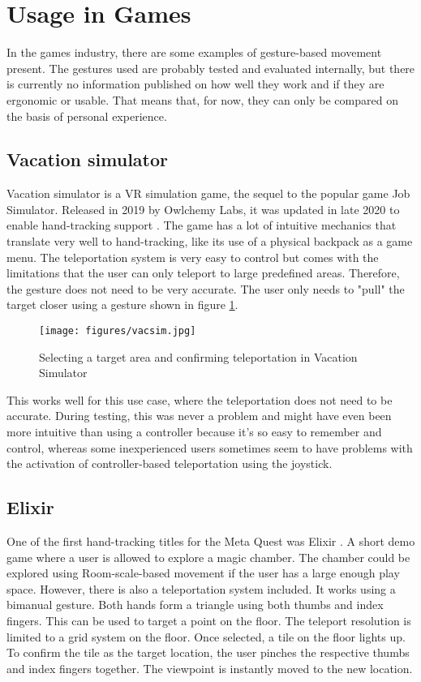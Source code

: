 \section{Usage in Games}
In the games industry, there are some examples of gesture-based movement present. The gestures used are probably tested and evaluated internally, but there is currently no information published on how well they work and if they are ergonomic or usable. That means that, for now, they can only be compared on the basis of personal experience. 


\subsection{Vacation simulator}
Vacation simulator \cite{VacSimOculus} is a VR simulation game, the sequel to the popular game Job Simulator. Released in 2019 by Owlchemy Labs, it was updated in late 2020 to enable hand-tracking support \cite{VacSimBlog}. The game has a lot of intuitive mechanics that translate very well to hand-tracking, like its use of a physical backpack as a game menu. The teleportation system is very easy to control but comes with the limitations that the user can only teleport to large predefined areas. Therefore, the gesture does not need to be very accurate. The user only needs to "pull" the target closer using a gesture shown in figure \ref{fig:pull}. 

\begin{figure}[hbt!]
  \centering
  \texttt{[image: figures/vacsim.jpg]}
  \caption{Selecting a target area and confirming teleportation in Vacation Simulator}
  \label{fig:pull}
\end{figure}

This works well for this use case, where the teleportation does not need to be accurate. During testing, this was never a problem and might have even been more intuitive than using a controller because it's so easy to remember and control, whereas some inexperienced users sometimes seem to have problems with the activation of controller-based teleportation using the joystick. 


\subsection{Elixir}
One of the first hand-tracking titles for the Meta Quest was Elixir \cite{Magnopus}. A short demo game where a user is allowed to explore a magic chamber. The chamber could be explored using Room-scale-based movement if the user has a large enough play space. However, there is also a teleportation system included. It works using a bimanual gesture. Both hands form a triangle using both thumbs and index fingers. This can be used to target a point on the floor. The teleport resolution is limited to a grid system on the floor. Once selected, a tile on the floor lights up. To confirm the tile as the target location, the user pinches the respective thumbs and index fingers together. The viewpoint is instantly moved to the new location.

